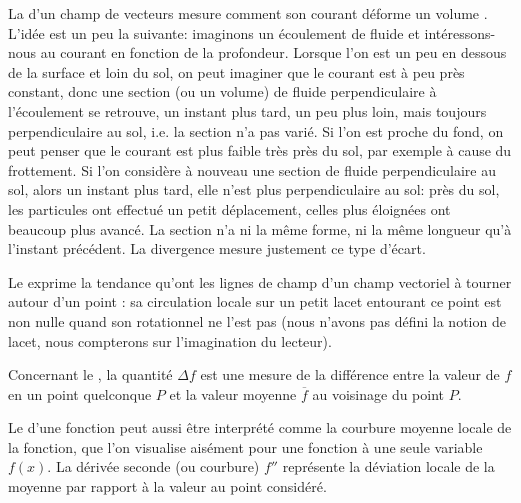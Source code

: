 La  d'un champ de vecteurs mesure comment son courant déforme
un volume .
{\small L'idée est un peu la suivante: imaginons un écoulement de fluide et intéressons-nous au
courant en fonction de la profondeur. Lorsque l'on est un peu en dessous de la surface et loin
du sol, on peut imaginer que le courant est à peu près constant, donc une section (ou un volume)
de fluide perpendiculaire à l'écoulement se retrouve, un instant plus tard, un peu plus
loin, mais toujours perpendiculaire au sol, i.e. la section n'a pas varié.
Si l'on est proche du fond, on peut penser que le courant est plus faible très près du
sol, par exemple à cause du frottement. Si l'on considère à nouveau une section
de fluide perpendiculaire au sol, alors un instant plus tard, elle n'est plus perpendiculaire
au sol: près du sol, les particules ont effectué un petit déplacement, celles plus éloignées ont
beaucoup plus avancé. La section n'a ni la même forme, ni la même longueur
qu'à l'instant précédent. La divergence mesure justement ce type d'écart.}


Le  exprime la tendance qu'ont les lignes de champ d'un champ vectoriel
à tourner autour d'un point : sa circulation locale sur un petit lacet entourant ce point est non nulle
quand son rotationnel ne l'est pas (nous n'avons pas défini la notion de lacet, nous compterons
sur l'imagination du lecteur). 

\medskip
Concernant le , la quantité $\Delta f$ est une mesure de la
différence entre la valeur de $f$ en un point quelconque $P$ et la valeur moyenne $\overline{f}$
au voisinage du point $P$.

Le  d'une fonction peut aussi être interprété comme la
courbure moyenne locale de la fonction, que l'on visualise aisément pour une fonction à
une seule variable $f(x)$.
La dérivée seconde (ou courbure) $f''$ représente la déviation locale de la moyenne par
rapport à la valeur au point considéré.


